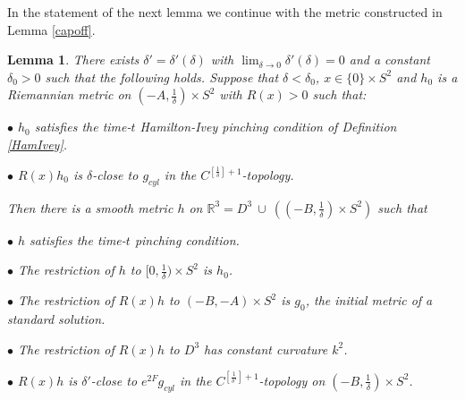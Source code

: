 \documentclass[12pt]{amsart}
\newcommand{\R}{{\mathbb R}}
\newcommand{\de}{\delta}
\newcommand{\ra}{\rightarrow}
\numberwithin{equation}{section}
\theoremstyle{plain}
\newtheorem{lemma}[equation]{Lemma}
\theoremstyle{definition}
\theoremstyle{remark}
\begin{document}
In the statement of the next lemma we continue with the metric
constructed in Lemma \ref{capoff}.
\begin{lemma}
\label{preservingphipinching}
There exists $\de'=\de'(\de)$ with $\lim_{\de\ra 0}\de'(\de)=0$ and a constant
$\de_0>0$
 such that the following holds.  Suppose that $\de<\de_0$, $x\in \{0\} \times S^2$
and $h_0$ is a Riemannian metric 
on $(-A,\frac{1}{\de}) \times S^2$ with $R(x) > 0$ such that:

\medskip
$\bullet$ $h_0$ satisfies the time-$t$ Hamilton-Ivey pinching condition of
Definition \ref{HamIvey}.

$\bullet$  $R(x)h_0$ is 
$\de$-close to $g_{cyl}$ in the $C^{[\frac{1}{\de}]+1}$-topology.

\bigskip
Then there is a smooth metric 
$h$ on $\R^3 = D^3 \: \cup \: \left( (-B,\frac{1}{\de}) \times S^2 \right)$
such that 

\medskip
$\bullet$ $h$ satisfies the time-$t$ pinching condition.

$\bullet$ The restriction of $h$ to $[0,\frac{1}{\de}) \times S^2$ is $h_0$.

$\bullet$  The restriction of $R(x)h$ to $(-B,-A) \times S^2$ is 
$g_{0}$, the initial metric of a standard solution.


$\bullet$  The restriction of $R(x)h$ to $D^3$ has constant curvature $k^2$.

$\bullet$ $R(x)h$ is $\de'$-close to $e^{2F}g_{cyl}$ in the $C^{[\frac{1}{\de'}]+1}$-topology on 
$\left( -B, \frac{1}{\delta} \right) \times S^2$.

\end{lemma}
\end{document}
